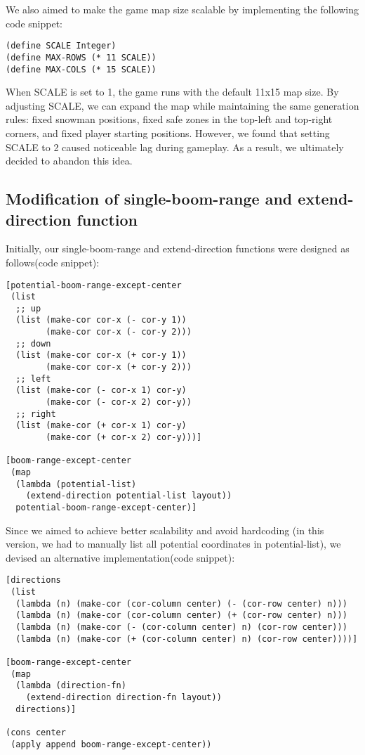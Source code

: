 \documentclass[12pt]{article}
\begin{document}
\indent We also aimed to make the game map size scalable by implementing the following code snippet:  
\begin{lstlisting}
(define SCALE Integer)
(define MAX-ROWS (* 11 SCALE))
(define MAX-COLS (* 15 SCALE))
\end{lstlisting}

\indent When SCALE is set to 1, the game runs with the default 11x15 map size. By adjusting SCALE, we can expand the map while maintaining the same generation rules: fixed snowman positions, fixed safe zones in the top-left and top-right corners, and fixed player starting positions. However, we found that setting SCALE to 2 caused noticeable lag during gameplay. As a result, we ultimately decided to abandon this idea.

\subsection*{Modification of single-boom-range and extend-direction function}
\hspace*{1.27cm}Initially, our single-boom-range and extend-direction functions were designed as follows(code snippet):

\begin{lstlisting}
[potential-boom-range-except-center
 (list
  ;; up
  (list (make-cor cor-x (- cor-y 1))
        (make-cor cor-x (- cor-y 2)))
  ;; down
  (list (make-cor cor-x (+ cor-y 1))
        (make-cor cor-x (+ cor-y 2)))
  ;; left
  (list (make-cor (- cor-x 1) cor-y)
        (make-cor (- cor-x 2) cor-y))
  ;; right
  (list (make-cor (+ cor-x 1) cor-y)
        (make-cor (+ cor-x 2) cor-y)))]

[boom-range-except-center
 (map
  (lambda (potential-list)
    (extend-direction potential-list layout))
  potential-boom-range-except-center)]
\end{lstlisting}

\indent Since we aimed to achieve better scalability and avoid hardcoding (in this version, we had to manually list all potential coordinates in potential-list), we devised an alternative implementation(code snippet):

\begin{lstlisting}
[directions
 (list
  (lambda (n) (make-cor (cor-column center) (- (cor-row center) n)))
  (lambda (n) (make-cor (cor-column center) (+ (cor-row center) n)))
  (lambda (n) (make-cor (- (cor-column center) n) (cor-row center)))
  (lambda (n) (make-cor (+ (cor-column center) n) (cor-row center))))]

[boom-range-except-center
 (map
  (lambda (direction-fn)
    (extend-direction direction-fn layout))
  directions)]

(cons center
 (apply append boom-range-except-center))
\end{lstlisting}
\end{document}
